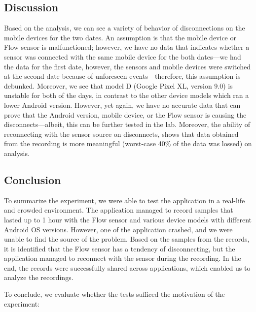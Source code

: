\subsection{Discussion}

Based on the analysis, we can see a variety of behavior of disconnections on the mobile devices for the two dates. An assumption is that the mobile device or Flow sensor is malfunctioned; however, we have no data that indicates whether a sensor was connected with the same mobile device for the both dates---we had the data for the first date, however, the sensors and mobile devices were switched at the second date because of unforeseen events---therefore, this assumption is debunked. Moreover, we see that model D (Google Pixel XL, version 9.0) is unstable for both of the days, in contrast to the other device models which ran a lower Android version. However, yet again, we have no accurate data that can prove that the Android version, mobile device, or the Flow sensor is causing the disconnects---albeit, this can be further tested in the lab. Moreover, the ability of reconnecting with the sensor source on disconnects, shows that data obtained from the recording is more meaningful (worst-case 40\% of the data was lossed) on analysis.


\subsection{Conclusion}
To summarize the experiment, we were able to test the application in a real-life and crowded environment. The application managed to record samples that lasted up to 1 hour with the Flow sensor and various device models with different Android OS versions. However, one of the application crashed, and we were unable to find the source of the problem. Based on the samples from the records, it is identified that the Flow sensor has a tendency of disconnecting, but the application managed to reconnect with the sensor during the recording. In the end, the records were successfully shared across applications, which enabled us to analyze the recordings.  

To conclude, we evaluate whether the tests sufficed the motivation of the experiment:

